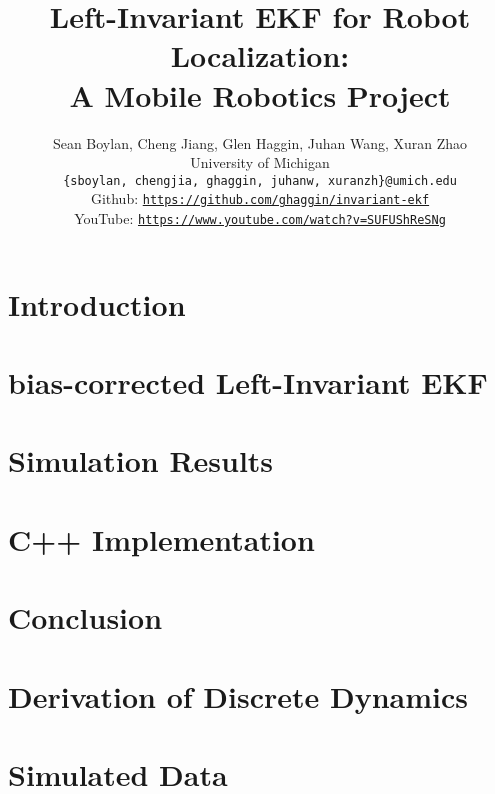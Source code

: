 \documentclass{IEEEtran}
\title{Left-Invariant EKF for Robot Localization:\\%
A Mobile Robotics Project}
\author{Sean Boylan, Cheng Jiang, Glen Haggin, Juhan Wang, Xuran Zhao\\
University of Michigan\\
\texttt{\{sboylan, chengjia, ghaggin, juhanw, xuranzh\}@umich.edu}\\[1em]
Github: \texttt{\href{https://github.com/ghaggin/invariant-ekf}{https://github.com/ghaggin/invariant-ekf}}\\
YouTube: \texttt{\href{https://www.youtube.com/watch?v=SUFUShReSNg&t}{https://www.youtube.com/watch?v=SUFUShReSNg}}
}
\begin{document}
\maketitle



\section{Introduction}


%

\section{bias-corrected Left-Invariant EKF}


\section{Simulation Results} \label{sec:simulation_results}


\section{C++ Implementation}


\section{Conclusion}


%


%

\begin{appendices}\label{appendices}

\section{Derivation of Discrete Dynamics} \label{sec:dyn_sec}


\section{Simulated Data} \label{sec:fake_data}


\end{appendices}
\end{document}
